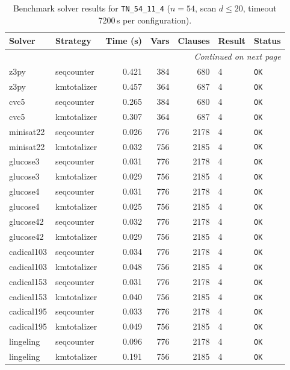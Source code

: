 \begin{longtable}{llrrrl p{}}
\caption{Benchmark solver results for \texttt{TN\_54\_11\_4} ($n=54$, scan $d \leq 20$, timeout 7200\,s per configuration).} \label{tab:bench-TN_54_11_4} \\
\toprule
Solver & Strategy & Time (s) & Vars & Clauses & Result & Status \\
\midrule
\endhead
\midrule
\multicolumn{7}{r}{\textit{Continued on next page}} \\
\midrule
\endfoot
\bottomrule
\endlastfoot
z3py & seqcounter & 0.421 & 384 & 680 & 4 & \texttt{OK} \\
z3py & kmtotalizer & 0.457 & 364 & 687 & 4 & \texttt{OK} \\
cvc5 & seqcounter & 0.265 & 384 & 680 & 4 & \texttt{OK} \\
cvc5 & kmtotalizer & 0.307 & 364 & 687 & 4 & \texttt{OK} \\
minisat22 & seqcounter & 0.026 & 776 & 2178 & 4 & \texttt{OK} \\
minisat22 & kmtotalizer & 0.032 & 756 & 2185 & 4 & \texttt{OK} \\
glucose3 & seqcounter & 0.031 & 776 & 2178 & 4 & \texttt{OK} \\
glucose3 & kmtotalizer & 0.029 & 756 & 2185 & 4 & \texttt{OK} \\
glucose4 & seqcounter & 0.031 & 776 & 2178 & 4 & \texttt{OK} \\
glucose4 & kmtotalizer & 0.025 & 756 & 2185 & 4 & \texttt{OK} \\
glucose42 & seqcounter & 0.032 & 776 & 2178 & 4 & \texttt{OK} \\
glucose42 & kmtotalizer & 0.029 & 756 & 2185 & 4 & \texttt{OK} \\
cadical103 & seqcounter & 0.034 & 776 & 2178 & 4 & \texttt{OK} \\
cadical103 & kmtotalizer & 0.048 & 756 & 2185 & 4 & \texttt{OK} \\
cadical153 & seqcounter & 0.031 & 776 & 2178 & 4 & \texttt{OK} \\
cadical153 & kmtotalizer & 0.040 & 756 & 2185 & 4 & \texttt{OK} \\
cadical195 & seqcounter & 0.033 & 776 & 2178 & 4 & \texttt{OK} \\
cadical195 & kmtotalizer & 0.049 & 756 & 2185 & 4 & \texttt{OK} \\
lingeling & seqcounter & 0.096 & 776 & 2178 & 4 & \texttt{OK} \\
lingeling & kmtotalizer & 0.191 & 756 & 2185 & 4 & \texttt{OK} \\

\end{longtable}
